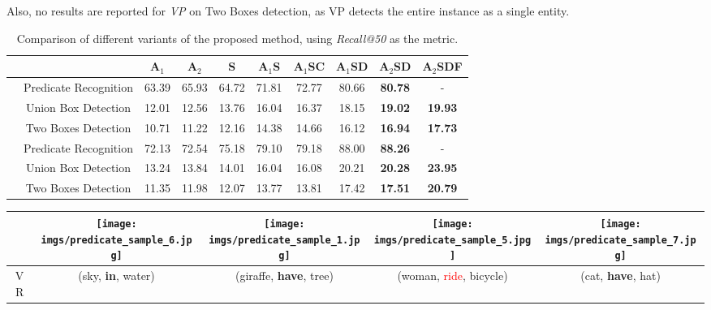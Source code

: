 \documentclass[10pt,twocolumn,letterpaper]{article}
\begin{document}
\begin{table*}[t]
{    Also, no results are reported for \emph{VP} on Two Boxes detection, as VP detects the entire instance as 
    a single entity.    
    }
    \label{tab:itr_rst}
\end{table*}\begin{table*}[t]
    \centering
    \small
\begin{tabular}{c|c|c|c|c|c|c|c|c|c}
	&  & A$_1$ & A$_2$ & S & A$_1$S & A$_1$SC & A$_1$SD & A$_2$SD &A$_2$SDF \\
	\hline
	\multirow{3}{*}{\rotatebox{90}{\textbf{VRD}}}
	& Predicate Recognition & 63.39 & 65.93 & 64.72 & 71.81 & 72.77 & 80.66 & \textbf{80.78} & -\\
	& Union Box Detection & 12.01 & 12.56 & 13.76 & 16.04 & 16.37 & 18.15 & \textbf{19.02} & \textbf{19.93} \\
	& Two Boxes Detection & 10.71 & 11.22 & 12.16 & 14.38 & 14.66 & 16.12 & \textbf{16.94} & \textbf{17.73} \\
	\hline
	\hline
	\multirow{3}{*}{\rotatebox{90}{\textbf{sVG}}}
	& Predicate Recognition & 72.13 & 72.54 & 75.18 & 79.10 & 79.18 & 88.00 & \textbf{88.26} & -\\
	& Union Box Detection & 13.24 & 13.84 & 14.01 & 16.04 & 16.08 & 20.21 & \textbf{20.28} & \textbf{23.95} \\
	& Two Boxes Detection & 11.35 & 11.98 & 12.07 & 13.77 & 13.81 & 17.42 & \textbf{17.51} & \textbf{20.79}
\end{tabular}
    \caption{\small Comparison of different variants of the proposed method, using \emph{Recall@50} as the metric.}
    \label{tab:cfg_rst}
\end{table*}\begin{table*}
    \centering
   \small
    \setlength{\tabcolsep}{1pt}
    \begin{tabular}{c|c|c|c|c}
         & \texttt{[image: imgs/predicate\_sample\_6.jpg]} 
                    & \texttt{[image: imgs/predicate\_sample\_1.jpg]}
                    & \texttt{[image: imgs/predicate\_sample\_5.jpg]}
                    & \texttt{[image: imgs/predicate\_sample\_7.jpg]}
        \\
        \hline
        VR\cite{lu2016visual} & (sky, \textbf{in}, water)
                            & (giraffe, \textbf{have}, tree)
                            & (woman, \textcolor{red}{ride}, bicycle)
                            & (cat, \textbf{have}, hat)

\end{tabular}
\end{table*}
\end{document}
